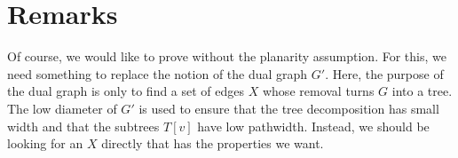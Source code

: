 \documentclass{patmorin}
\begin{document}
\section{Remarks}

Of course, we would like to prove  without the planarity
assumption.  For this, we need something to replace the notion of the
dual graph $G'$.  Here, the purpose of the dual graph is only to find a
set of edges $X$ whose removal turns $G$ into a tree.  The low diameter
of $G'$ is used to ensure that the tree decomposition has small width
and that the subtrees $T[v]$ have low pathwidth.  Instead, we should be
looking for an $X$ directly that has the properties we want.



\end{document}
